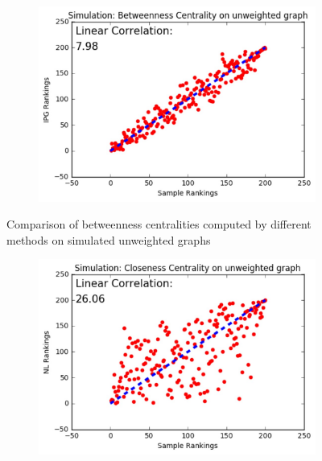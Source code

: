 \documentclass[9pt]{beamer}
\begin{document}
\begin{frame}
\begin{figure}[H]
\begin{subfigure}{.32\textwidth}
	\centering
    \includegraphics[width=0.95\linewidth]{BCU_IPG.jpeg}
\end{subfigure}
\caption{Comparison of betweenness centralities computed by different methods on simulated unweighted graphs}
\end{figure}
\vspace{-0.1in}
\begin{figure}[H]
\centering
\begin{subfigure}{.32\textwidth}
  \centering
  \includegraphics[width=0.95\linewidth]{CCU_NL.jpeg}
\end{subfigure}
\begin{subfigure}{.32\textwidth}
	\centering

\end{subfigure}
\end{figure}
\end{frame}
\end{document}
